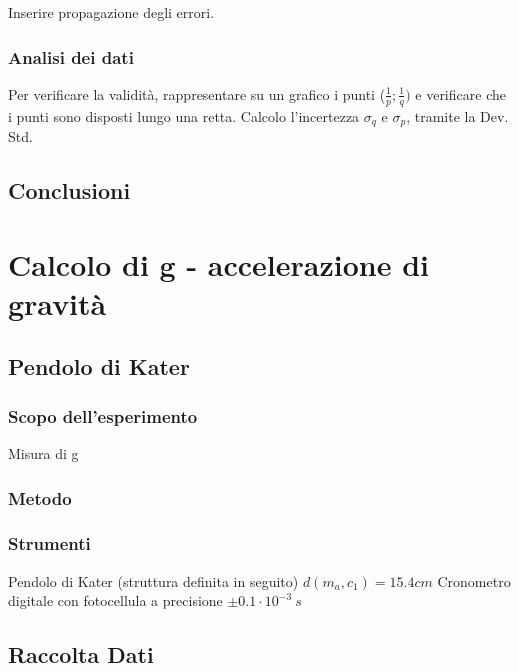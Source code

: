 \documentclass[a4paper,10pt]{report}
\begin{document}
Inserire propagazione degli errori. 
\subsection{Analisi dei dati}
Per verificare la validità, rappresentare su un grafico i punti ($\frac{1}{p};\frac{1}{q})$ e verificare che i punti sono disposti lungo una retta. 
Calcolo l'incertezza $\sigma_{q}$ e $\sigma_{p}$, tramite la Dev. Std. 



\section{Conclusioni}






\chapter{Calcolo di g - accelerazione di gravità}
\section{Pendolo di Kater}
\subsection{Scopo dell'esperimento}
Misura di g
\subsection{Metodo}
\subsection{Strumenti}
Pendolo di Kater (struttura definita in seguito)
$d(m_a,c_1)=15.4 cm$
Cronometro digitale con fotocellula a precisione $\pm 0.1 \cdot 10^{-3}\ s$ 
\section{Raccolta Dati}
\end{document}
